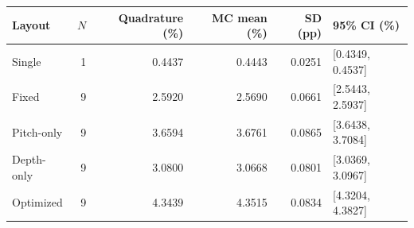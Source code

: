 \begin{tabular}{lrrrrl}
\toprule
Layout & $N$ & Quadrature (\%) & MC mean (\%) & SD (pp) & 95\% CI (\%) \\
\midrule
Single & 1 & 0.4437 & 0.4443 & 0.0251 & [0.4349, 0.4537] \\
Fixed & 9 & 2.5920 & 2.5690 & 0.0661 & [2.5443, 2.5937] \\
Pitch-only & 9 & 3.6594 & 3.6761 & 0.0865 & [3.6438, 3.7084] \\
Depth-only & 9 & 3.0800 & 3.0668 & 0.0801 & [3.0369, 3.0967] \\
Optimized & 9 & 4.3439 & 4.3515 & 0.0834 & [4.3204, 4.3827] \\
\bottomrule
\end{tabular}
